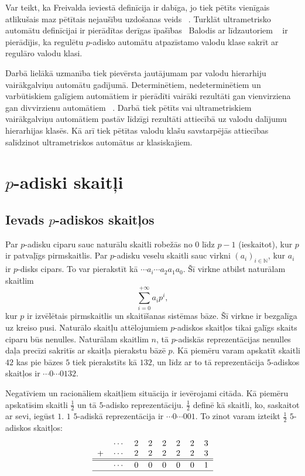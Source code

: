 \documentclass{ludis}
\begin{document}
Var teikt, ka Freivalda ieviestā definīcija ir dabīga, jo tiek pētīts vienīgais atlikušais maz pētītais nejaušību uzdošanas veids ~\citep{Freivalds2012}. Turklāt ultrametrisko automātu definīcijai ir pierādītas derīgas īpašības \textendash\ Balodis ar līdzautoriem ~\citep{KasparsBalodis2013} ir pierādījis, ka regulētu $p$-adisko automātu atpazīstamo valodu klase sakrīt ar regulāro valodu klasi.

Darbā lielākā uzmanība tiek pievērsta jautājumam par valodu hierarhiju vairākgalviņu automātu gadījumā. Determinētiem, nedeterminētiem un varbūtiskiem galīgiem automātiem ir pierādīti vairāki rezultāti gan vienvirziena gan divvirzienu automātiem ~\citep{Holzer2009,Yao1978,Monien1980,Macarie1995}. Darbā tiek pētīts vai ultrametriskiem vairākgalviņu automātiem pastāv līdzīgi rezultāti attiecībā uz valodu dalījumu hierarhijas klasēs. Kā arī tiek pētītas valodu klašu savstarpējās attiecības salīdzinot ultrametriskos automātus ar klasiskajiem.
\chapter{$p$-adiski skaitļi}
\section{Ievads $p$-adiskos skaitļos}
Par $p$-adisku ciparu sauc naturālu skaitli robežās no $0$ līdz $p-1$ (ieskaitot), kur $p$ ir patvaļīgs pirmskaitlis. Par $p$-adisku veselu skaitli sauc virkni $(a_i)_{i \in \mathbb{N}}$, kur $a_i$ ir $p$-disks cipars. To var pierakstīt kā $\cdots a_i \cdots a_2a_1a_0$.
Šī virkne atbilst naturālam skaitlim
\[\sum\limits_{i=0}^{+\infty}a_ip^i,
\]
kur $p$ ir izvēlētais pirmskaitlis un skaitīšanas sistēmas bāze. Šī virkne ir bezgalīga uz kreiso pusi. Naturālo skaitļu attēlojumiem $p$-adiskos skaitļos tikai galīgs skaits ciparu būs nenulles. Naturālam skaitlim $n$, tā $p$-adiskās reprezentācijas nenulles daļa precīzi sakritīs ar skaitļa pierakstu bāzē $p$. Kā piemēru varam apskatīt skaitli $42$ kas pie bāzes $5$ tiek pierakstīts kā $132$, un līdz ar to tā reprezentācija $5$-adiskos skaitļos ir $\cdots 0 \cdots 0132$.

Negatīviem un racionāliem skaitļiem situācija ir ievērojami citāda. Kā piemēru apskatīsim skaitli $\frac{1}{2}$ un tā $5$-adisko reprezentāciju. $\frac{1}{2}$ definē kā skaitli, ko, saskaitot ar sevi, iegūst $1$. $1$ $5$-adiskā reprezentācija ir $\cdots 0 \cdots 001$. To zinot varam izteikt $\frac{1}{2}$ $5$-adiskos skaitļos:
\[
\begin{tabular}{rrrrrrrrr|}
&$\cdots$ &2 &2 &2 &2 &2 &3\\
+&$\cdots$ &2 &2 &2 &2 &2 &3\\
\hline
\hline
&$\cdots$ &0 &0 &0 &0 &0 &1\\
\hline
\end{tabular}
\]
\end{document}
